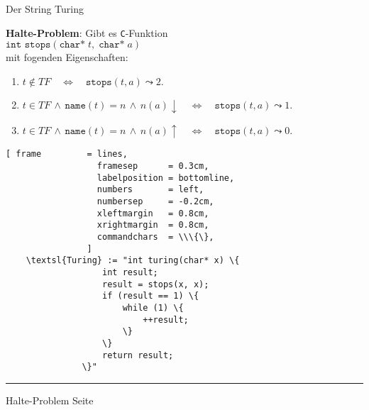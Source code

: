 \documentclass{slides}
\newcounter{mypage}
\begin{document}
\begin{slide}{}
 \begin{center}
Der String Turing
\end{center}

\footnotesize
\textbf{Halte-Problem}:
Gibt es \texttt{C}-Funktion \\[0.3cm]
\hspace*{1.3cm} 
$\texttt{int stops}(\texttt{char*}\;t,\;\texttt{char*}\;a)$ \\[0.3cm]
mit fogenden Eigenschaften:
\begin{enumerate}
\item $t \not\in T\!F \quad\Leftrightarrow\quad \mathtt{stops}(t, a) \leadsto 2$.
\item $t \in T\!F \,\wedge\, \mathtt{name}(t) = n \,\wedge\, n(a)\downarrow \quad\Leftrightarrow\quad
       \mathtt{stops}(t, a) \leadsto 1$.
\item $t \in T\!F \,\wedge\, \mathtt{name}(t) = n \,\wedge\, n(a)\uparrow \quad\Leftrightarrow\quad
       \mathtt{stops}(t, a) \leadsto 0$.
\end{enumerate}



\begin{Verbatim}[ frame         = lines, 
                  framesep      = 0.3cm, 
                  labelposition = bottomline,
                  numbers       = left,
                  numbersep     = -0.2cm,
                  xleftmargin   = 0.8cm,
                  xrightmargin  = 0.8cm,
                  commandchars  = \\\{\},
                ]
    \textsl{Turing} := "int turing(char* x) \{
                   int result;
                   result = stops(x, x);
                   if (result == 1) \{
                       while (1) \{
                           ++result;
                       \}
                   \}
                   return result;
               \}"
\end{Verbatim}


\vspace*{\fill}
\tiny \addtocounter{mypage}{1}
\rule{17cm}{1mm}
Halte-Problem \hspace*{\fill} Seite 
\end{slide}
\end{document}
